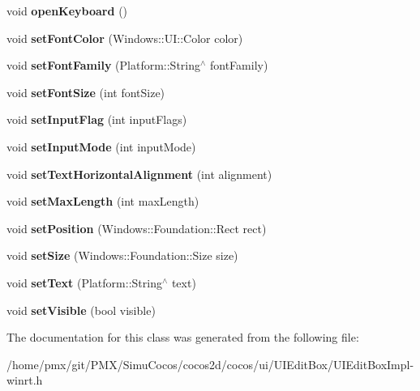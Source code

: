 \begin{DoxyCompactItemize}
void {\bfseries open\+Keyboard} ()
\item 
\mbox{\label{classui_1_1sealed_a684b3edd342648a25e44495cc0acf5d8}} 
void {\bfseries set\+Font\+Color} (Windows\+::\+U\+I\+::\+Color color)
\item 
\mbox{\label{classui_1_1sealed_a682bbd4fb4835cdb29e353d07e9b85d6}} 
void {\bfseries set\+Font\+Family} (Platform\+::\+String$^\wedge$ font\+Family)
\item 
\mbox{\label{classui_1_1sealed_ad2dc50c04821b025515be9259b81da4a}} 
void {\bfseries set\+Font\+Size} (int font\+Size)
\item 
\mbox{\label{classui_1_1sealed_a19fd1b58a8bc758fa8d3b9ceecad6db9}} 
void {\bfseries set\+Input\+Flag} (int input\+Flags)
\item 
\mbox{\label{classui_1_1sealed_a758cf93a8ac3da42e92a8b611e1c3b46}} 
void {\bfseries set\+Input\+Mode} (int input\+Mode)
\item 
\mbox{\label{classui_1_1sealed_af88823c8eb5012542fd345246b82ee7f}} 
void {\bfseries set\+Text\+Horizontal\+Alignment} (int alignment)
\item 
\mbox{\label{classui_1_1sealed_ab041cba2fe6ed5d71b93305da3374c75}} 
void {\bfseries set\+Max\+Length} (int max\+Length)
\item 
\mbox{\label{classui_1_1sealed_ac0a9ae3cc307348f696e3c56744f3d7b}} 
void {\bfseries set\+Position} (Windows\+::\+Foundation\+::\+Rect rect)
\item 
\mbox{\label{classui_1_1sealed_afddef2cad71aac6fd5c484f2c5abcb0f}} 
void {\bfseries set\+Size} (Windows\+::\+Foundation\+::\+Size size)
\item 
\mbox{\label{classui_1_1sealed_a1ed25b1833671a4331a95296881cfdbc}} 
void {\bfseries set\+Text} (Platform\+::\+String$^\wedge$ text)
\item 
\mbox{\label{classui_1_1sealed_a53e7a0fa53fce56e8b5ddc91814dfc08}} 
void {\bfseries set\+Visible} (bool visible)
\end{DoxyCompactItemize}


The documentation for this class was generated from the following file\+:\begin{DoxyCompactItemize}
\item 
/home/pmx/git/\+P\+M\+X/\+Simu\+Cocos/cocos2d/cocos/ui/\+U\+I\+Edit\+Box/U\+I\+Edit\+Box\+Impl-\/winrt.\+h\end{DoxyCompactItemize}
